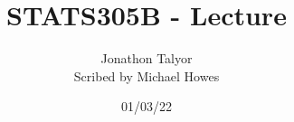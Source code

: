 




\title{STATS305B - Lecture }
\author{Jonathon Talyor\\ Scribed by Michael Howes}
\date{01/03/22}

\pagestyle{fancy}
\fancyhf{}


\maketitle
\tableofcontents
